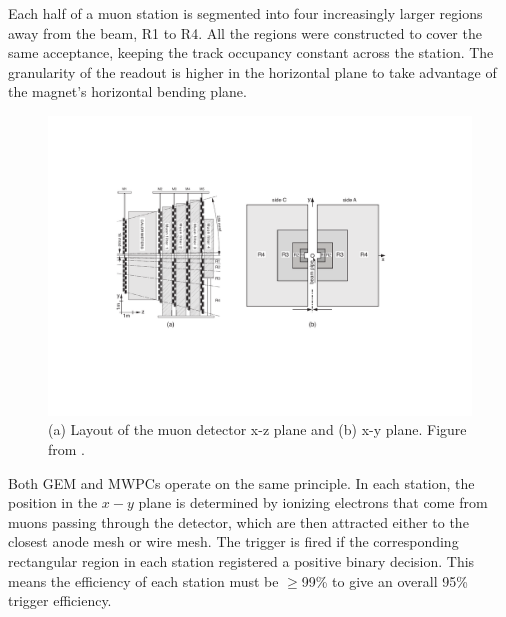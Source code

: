
Each half of a muon station is segmented into four increasingly larger regions away from the beam, R1 to R4.
 All the regions were constructed to cover the same acceptance, keeping the track occupancy constant across the station. The granularity of the readout is higher in the horizontal plane to take advantage of the magnet's horizontal bending plane.




\begin{figure}[!h]
	\centering
	\includegraphics[width = 1.0\textwidth]{figs/detector/sideview.pdf}%
	\caption{(a) Layout of the muon detector x-z plane and (b) x-y plane. Figure from \cite{LHCb-DP-2012-002}. }  
	\label{fig:MuonGran}
\end{figure}

Both GEM and \Gls{MWPCs} operate on the same principle. In each station, the position in the $x-y$ plane is determined by ionizing electrons that come from muons passing through the detector, which are then attracted either to the closest anode mesh or wire mesh. The trigger is fired if the corresponding rectangular region in each station registered a positive binary decision. This means the efficiency of each station must be $\geq$99\% to give an overall 95\% trigger efficiency. %


